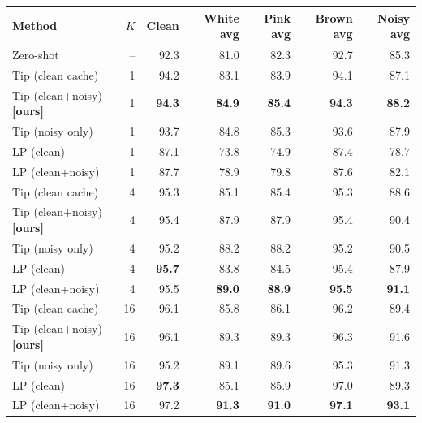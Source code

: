 \begin{tabular}{lrrrrrr}
\toprule
Method & $K$ & Clean & White avg & Pink avg & Brown avg & Noisy avg \\
\midrule
Zero-shot & -- & 92.3 & 81.0 & 82.3 & 92.7 & 85.3 \\
\midrule
Tip (clean cache) & 1 & 94.2 & 83.1 & 83.9 & 94.1 & 87.1 \\
Tip (clean+noisy) \textbf{[ours]} & 1 & \textbf{94.3} & \textbf{84.9} & \textbf{85.4} & \textbf{94.3} & \textbf{88.2} \\
Tip (noisy only) & 1 & 93.7 & 84.8 & 85.3 & 93.6 & 87.9 \\
LP (clean) & 1 & 87.1 & 73.8 & 74.9 & 87.4 & 78.7 \\
LP (clean+noisy) & 1 & 87.7 & 78.9 & 79.8 & 87.6 & 82.1 \\
\midrule
Tip (clean cache) & 4 & 95.3 & 85.1 & 85.4 & 95.3 & 88.6 \\
Tip (clean+noisy) \textbf{[ours]} & 4 & 95.4 & 87.9 & 87.9 & 95.4 & 90.4 \\
Tip (noisy only) & 4 & 95.2 & 88.2 & 88.2 & 95.2 & 90.5 \\
LP (clean) & 4 & \textbf{95.7} & 83.8 & 84.5 & 95.4 & 87.9 \\
LP (clean+noisy) & 4 & 95.5 & \textbf{89.0} & \textbf{88.9} & \textbf{95.5} & \textbf{91.1} \\
\midrule
Tip (clean cache) & 16 & 96.1 & 85.8 & 86.1 & 96.2 & 89.4 \\
Tip (clean+noisy) \textbf{[ours]} & 16 & 96.1 & 89.3 & 89.3 & 96.3 & 91.6 \\
Tip (noisy only) & 16 & 95.2 & 89.1 & 89.6 & 95.3 & 91.3 \\
LP (clean) & 16 & \textbf{97.3} & 85.1 & 85.9 & 97.0 & 89.3 \\
LP (clean+noisy) & 16 & 97.2 & \textbf{91.3} & \textbf{91.0} & \textbf{97.1} & \textbf{93.1} \\
\bottomrule
\end{tabular}